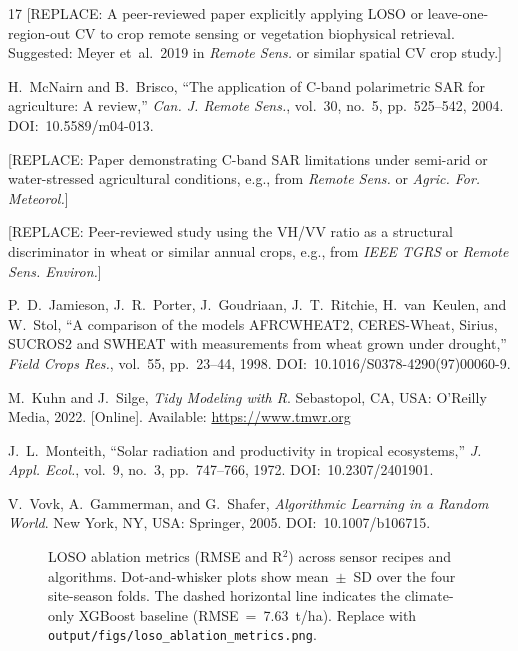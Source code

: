\documentclass[lettersize,journal]{IEEEtran}
\begin{document}
\begin{thebibliography}{17}
[REPLACE: A peer-reviewed paper explicitly applying LOSO or
leave-one-region-out CV to crop remote sensing or vegetation
biophysical retrieval. Suggested: Meyer et~al.\ 2019 in
\textit{Remote Sens.} or similar spatial CV crop study.]

H.~McNairn and B.~Brisco, ``The application of C-band polarimetric SAR
for agriculture: A review,'' \textit{Can. J. Remote Sens.}, vol.~30,
no.~5, pp.~525--542, 2004. DOI:~10.5589/m04-013.

[REPLACE: Paper demonstrating C-band SAR limitations under semi-arid or
water-stressed agricultural conditions, e.g., from \textit{Remote Sens.}
or \textit{Agric. For. Meteorol.}]

[REPLACE: Peer-reviewed study using the VH/VV ratio as a structural
discriminator in wheat or similar annual crops, e.g., from
\textit{IEEE TGRS} or \textit{Remote Sens. Environ.}]

P.~D.~Jamieson, J.~R.~Porter, J.~Goudriaan, J.~T.~Ritchie, H.~van~Keulen,
and W.~Stol, ``A comparison of the models AFRCWHEAT2, CERES-Wheat, Sirius,
SUCROS2 and SWHEAT with measurements from wheat grown under drought,''
\textit{Field Crops Res.}, vol.~55, pp.~23--44, 1998.
DOI:~10.1016/S0378-4290(97)00060-9.

M.~Kuhn and J.~Silge, \textit{Tidy Modeling with R}.
Sebastopol, CA, USA: O'Reilly Media, 2022. [Online].
Available: \url{https://www.tmwr.org}

J.~L.~Monteith, ``Solar radiation and productivity in tropical ecosystems,''
\textit{J. Appl. Ecol.}, vol.~9, no.~3, pp.~747--766, 1972.
DOI:~10.2307/2401901.

V.~Vovk, A.~Gammerman, and G.~Shafer,
\textit{Algorithmic Learning in a Random World}.
New York, NY, USA: Springer, 2005. DOI:~10.1007/b106715.

\end{thebibliography}


\begin{figure}[!t]
\centering
\fbox{\rule{0pt}{2.5in}\rule{3.0in}{0pt}}
\caption{LOSO ablation metrics (RMSE and R$^2$) across sensor recipes and
algorithms. Dot-and-whisker plots show mean~$\pm$~SD over the four
site-season folds. The dashed horizontal line indicates the climate-only
XGBoost baseline (RMSE~=~7.63~t/ha). Replace with
\texttt{output/figs/loso\_ablation\_metrics.png}.}
\label{fig:ablation}
\end{figure}
\end{document}
